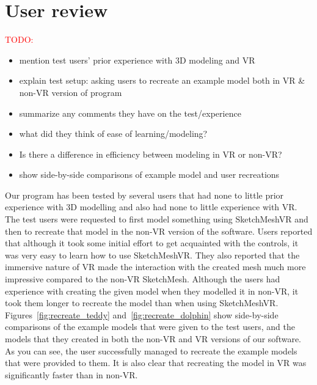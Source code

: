 \section{User review}

\textcolor{red}{TODO:}
\begin{itemize}
\item mention test users' prior experience with 3D modeling and VR
\item explain test setup: asking users to recreate an example model both in VR \& non-VR version of program
\item summarize any comments they have on the test/experience
\item what did they think of ease of learning/modeling?
\item Is there a difference in efficiency between modeling in VR or non-VR?
\item show side-by-side comparisons of example model and user recreations
\end{itemize}


Our program has been tested by several users that had none to little prior experience with 3D modelling and also had none to little experience with VR. The test users were requested to first model something  using SketchMeshVR and then to recreate that model in the non-VR version of the software. Users reported that although it took some initial effort to get acquainted with the controls, it was very easy to learn how to use SketchMeshVR. They also reported that the immersive nature of VR made the interaction with the created mesh much more impressive compared to the non-VR SketchMesh. Although the users had experience with creating the given model when they modelled it in non-VR, it took them longer to recreate the model than when using SketchMeshVR. Figures~\ref{fig:recreate_teddy} and~\ref{fig:recreate_dolphin} show side-by-side comparisons of the example models that were given to the test users, and the models that they created in both the non-VR and VR versions of our software. As you can see, the user successfully managed to recreate the example models that were provided to them. It is also clear that recreating the model in VR was significantly faster than in non-VR. 


